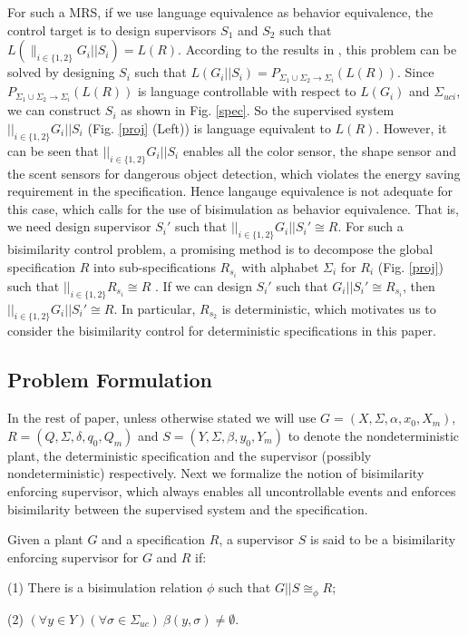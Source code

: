 \documentclass[preprint,authoryear,12pt]{elsarticle}
\begin{document}
For such a MRS, if we use language equivalence as behavior
equivalence, the control target is to design supervisors $S_1$ and
$S_2$ such that $L(\parallel_{i \in \{1, 2\}}G_i||S_i)=L(R)$.
According to the results in \citep{willner1991supervisory}, this
problem can be solved by designing $S_i$ such that
$L(G_i||S_i)=P_{\Sigma_1\!\cup\!\Sigma_2\rightarrow
\Sigma_{i}}(L(R))$. Since $P_{\Sigma_1\!\cup\!\Sigma_2\rightarrow
\Sigma_{i}}(L(R))$ is language controllable with respect to
$L(G_i)$ and $\Sigma_{uci}$, we can construct $S_i$ as shown in
Fig. \ref{spec}. So the supervised system $||_{i \in \{1,
2\}}G_i||S_i$ (Fig. \ref{proj} (Left)) is language equivalent to
$L(R)$. However, it can be seen that $||_{i \in \{1, 2\}}G_i||S_i$
enables all the color sensor, the shape sensor and the scent
sensors for dangerous object detection, which violates the energy
saving requirement in the specification. Hence langauge
equivalence is not adequate for this case, which calls for the use
of bisimulation as behavior equivalence. That is, we need design
supervisor $S_i'$ such that $||_{i \in \{1, 2\}}G_i||S_i' \cong
R$. For such a bisimilarity control problem, a promising method
\citep{karimadini2011guaranteed} is to decompose the global
specification $R$ into sub-specifications $R_{s_i}$ with alphabet
$\Sigma_{i}$ for $R_i$ (Fig. \ref{proj}) such that $||_{i \in \{1,
2\}}R_{s_i}\cong R$ . If we can design $S_i'$ such that $G_i||S_i'
\cong R_{s_i}$, then $||_{i \in \{1, 2\}}G_i||S_i' \cong R$. In
particular, $R_{s_2}$ is deterministic, which motivates us to
consider the bisimilarity control for deterministic specifications
in this paper.





\subsection{Problem Formulation}
In the rest of paper, unless otherwise stated we will use $G=(X,
\Sigma, \alpha, x_{0}, X_m)$, $R=(Q, \Sigma, \delta, q_{0}, Q_m)$
and $S=(Y, \Sigma, \beta, y_0, Y_m)$ to denote the
nondeterministic plant, the deterministic specification and the
supervisor (possibly nondeterministic) respectively. Next we
formalize the notion of bisimilarity enforcing supervisor, which
always enables all uncontrollable events and enforces bisimilarity
between the supervised system and the specification.



\begin{Definition}\label{bissup}
Given a plant $G$ and a specification $R$, a supervisor $S$ is
said to be a bisimilarity enforcing supervisor for $G$ and $R$ if:

(1) There is a bisimulation relation $\phi$ such that $G||S
\cong_{\phi} R$;

(2) $(\forall y \in Y)(\forall \sigma \in \Sigma_{uc}) ~\beta(y,
\sigma) \neq \emptyset$.

\end{Definition}
\end{document}
